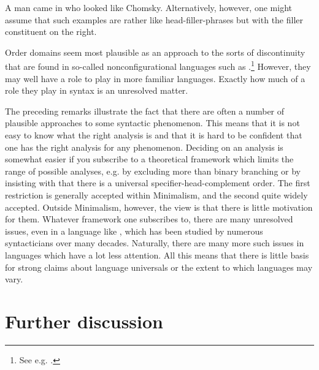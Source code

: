 \documentclass[output=paper]{langsci/langscibook}
\begin{document}
\ea\label{ex:borsley:4.32}
    A man came in who looked like Chomsky.
\ex \label{ex:borsley:4.33}
\z
%
Alternatively, however, one might assume that such examples are rather like
head-filler-phrases but with the filler constituent on the right.

Order domains seem most plausible as an approach to the sorts of discontinuity
that are found in so-called nonconfigurational languages such as
.\footnote{ \textrm{See e.g. \citet{DonohueSag1999}.}} However, they
may well have a role to play in more familiar languages. Exactly how much of a
role they play in syntax is an unresolved matter.

The preceding remarks illustrate the fact that there are often a number of
plausible approaches to some syntactic phenomenon. This means that it is not
easy to know what the right analysis is and that it is hard to be confident
that one has the right analysis for any phenomenon. Deciding on an analysis is
somewhat easier if you subscribe to a theoretical framework which limits the
range of possible analyses, e.g. by excluding more than binary branching or by
insisting with \citet{Kayne1994} that there is a universal
specifier-head-complement order. The first restriction is generally accepted
within Minimalism, and the second quite widely accepted. Outside Minimalism,
however, the view is that there is little motivation for them. Whatever
framework one subscribes to, there are many unresolved issues, even in a
language like , which has been studied by numerous syntacticians over
many decades. Naturally, there are many more such issues in languages which
have a lot less attention. All this means that there is little basis for strong
claims about language universals or the extent to which languages may vary.

\section{Further discussion}\label{sec-5:5}
\end{document}
